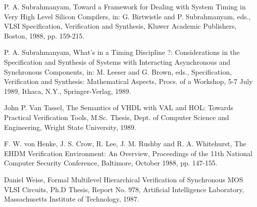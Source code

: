 \begin{thebibliography}{99}
P. A. Subrahmanyam,
Toward a Framework for Dealing with System Timing in
Very High Level Silicon Compilers, in:
G. Birtwistle and P. Subrahmanyam, eds.,
VLSI Specification, Verification and Synthesis,
Kluwer Academic Publishers, Boston, 1988,
pp. 159-215.

P. A. Subrahmanyam,
What's in a Timing Discipline ?:
Considerations in the Specification and Synthesis of Systems with
Interacting Asynchronous and Synchronous Components, in:
M. Leeser and G. Brown, eds.,
Specification, Verification and Synthesis:
Mathematical Aspects,
Procs. of a Workshop, 5-7 July 1989,
Ithaca, N.Y.,
Springer-Verlag,
1989.

John P. Van Tassel,
The Semantics of VHDL with VAL and HOL:
Towards Practical Verification Tools,
M.Sc. Thesis,
Dept. of Computer Science and Engineering,
Wright State University,
1989.

F. W. von Henke, J. S. Crow, R. Lee, J. M. Rushby and R. A. Whitehurst,
The EHDM Verification Environment: An Overview,
Proceedings of the 11th National Computer Security Conference,
Baltimore, October 1988,
pp. 147-155.

Daniel Weise,
Formal Multilevel Hierarchical Verification of Synchronous
MOS VLSI Circuits,
Ph.D Thesis,
Report No. 978,
Artificial Intelligence Laboratory,
Massachusetts Institute of Technology,
1987.

\end{thebibliography}
